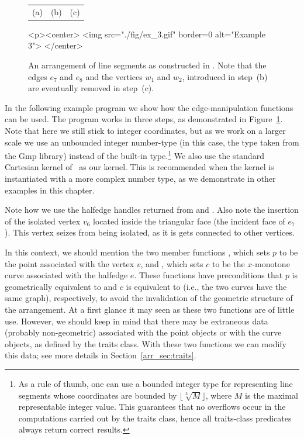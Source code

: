 \begin{figure}[t]
\begin{ccTexOnly}
\begin{center}
\begin{tabular}{ccc}
  {\small (a)} & {\small (b)} & {\small (c)}\\
  \end{tabular}
  \end{center}
\end{ccTexOnly}
\begin{ccHtmlOnly}
  <p><center>
  <img src="./fig/ex_3.gif" border=0 alt="Example 3">
  </center>
\end{ccHtmlOnly}
\caption{An arrangement of line segments as constructed
in . Note that the edges $e_7$ and $e_8$ and the
vertices $w_1$ and $w_2$, introduced in step~(b) are eventually
removed in step~(c).}
\label{arr_fig:ex_3}
\end{figure}

In the following example program we show how the edge-manipulation
functions can be used. The program works in three
steps, as demonstrated in Figure~\ref{arr_fig:ex_3}. Note that
here we still stick to integer coordinates, but as we work on a
larger scale we use an unbounded integer number-type (in this
case, the  type taken from the {\sc Gmp} library)
instead of the built-in  type.\footnote{As a rule of
thumb, one can use a bounded integer type for representing line
segments whose coordinates are bounded by
$\lfloor\sqrt[3]{M}\rfloor$, where $M$ is the maximal
representable integer value. This guarantees that no overflows occur
in the computations carried out by the traits class, hence all traits-class
predicates always return correct results.} We also use the standard Cartesian
kernel of \cgal\ as our kernel. This is recommended when the
kernel is instantiated with a more complex number type, as we
demonstrate in other examples in this chapter.


Note how we use the halfedge handles returned from
 and . Also note the insertion
of the isolated vertex $v_6$ located inside the triangular face (the
incident face of $e_7$). This vertex seizes from being isolated, as it
is gets connected to other vertices.

In this context, we should mention the two member functions
, which sets $p$ to be the point
associated with the vertex $v$, and , which
sets $c$ to be the $x$-monotone curve associated with the halfedge
$e$. These functions have preconditions that $p$ is
geometrically equivalent to  and $c$ is equivalent
to  (i.e., the two curves have the same graph),
respectively, to avoid the invalidation of the geometric structure of
the arrangement. At a first glance it may seen as these two functions
are of little use. However, we should keep in mind that there may be
extraneous data (probably non-geometric) associated with the point
objects or with the curve objects, as defined by the traits class. With
these two functions we can modify this data; see more details in
Section~\ref{arr_sec:traits}.

